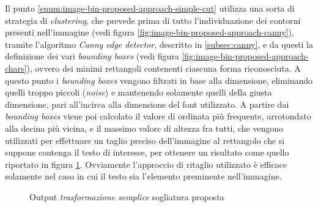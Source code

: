Il punto \ref{enum:image-bin-proposed-approach-simple-cut} utilizza una sorta di strategia di \textit{clustering}, che prevede prima di tutto l'individuazione dei contorni presenti nell'immagine (vedi figura \ref{fig:image-bin-proposed-approach-canny}), tramite l'algoritmo \textit{Canny edge detector}, descritto in \ref{subsec:canny}, e da questi la definizione dei vari \textit{bounding boxes} (vedi figura \ref{fig:image-bin-proposed-approach-chars}), ovvero dei minimi rettangoli contenenti ciascuna forma riconosciuta. A questo punto i \textit{bounding boxes} vengono filtrati in base alla dimensione, eliminando quelli troppo piccoli (\textit{noise}) e mantenendo solamente quelli della giusta dimensione, pari all'incirca alla dimensione del font utilizzato. A partire dai \textit{bounding boxes} viene poi calcolato il valore di ordinata pi\`u frequente, arrotondato alla decina pi\`u vicina, e il massimo valore di altezza fra tutti, che vengono utilizzati per effettuare un taglio preciso dell'immagine al rettangolo che si suppone contenga il testo di interesse, per ottenere un risultato come quello riportato in figura \ref{fig:image-bin-proposed-approach-simple}. Ovviamente l'approccio di ritaglio utilizzato \`e efficace solamente nel caso in cui il testo sia l'elemento preminente nell'immagine.
\begin{figure}[H]
	\centering
	\caption{Output \textit{trasformazione semplice} sogliatura proposta}
	\label{fig:image-bin-proposed-approach-simple}
\end{figure}
\setcounter{totalnumber}{1}


